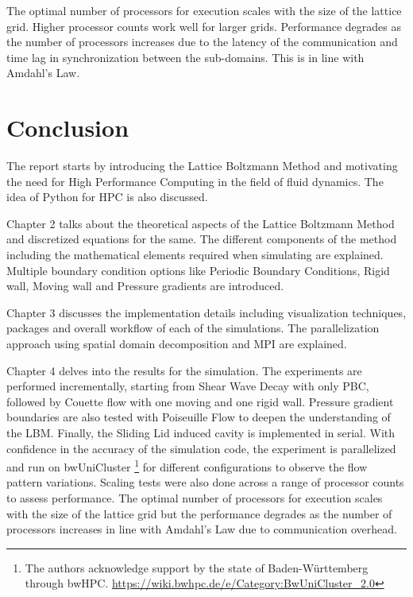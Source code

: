 \documentclass[a4paper,11pt]{report}
\begin{document}
The optimal number of processors for execution scales with the size of the lattice grid. Higher processor counts work well for larger grids. Performance degrades as the number of processors increases due to the latency of the communication and time lag in synchronization between the sub-domains. This is in line with Amdahl's Law.


\chapter{Conclusion}
The report starts by introducing the Lattice Boltzmann Method and motivating the need for High Performance Computing in the field of fluid dynamics. The idea of Python for HPC is also discussed.

Chapter 2 talks about the theoretical aspects of the Lattice Boltzmann Method and discretized equations for the same. The different components of the method including the mathematical elements required when simulating are explained. Multiple boundary condition options like Periodic Boundary Conditions, Rigid wall, Moving wall and Pressure gradients are introduced.

Chapter 3 discusses the implementation details including visualization techniques, packages and overall workflow of each of the simulations. The parallelization approach using spatial domain decomposition and MPI are explained.

Chapter 4 delves into the results for the simulation. The experiments are performed incrementally, starting from Shear Wave Decay with only PBC, followed by Couette flow with one moving and one rigid wall. Pressure gradient boundaries are also tested with Poiseuille Flow to deepen the understanding of the LBM. Finally, the Sliding Lid induced cavity is implemented in serial. With confidence in the accuracy of the simulation code, the experiment is parallelized and run on bwUniCluster \footnote{The authors acknowledge support by the state of Baden-Württemberg through bwHPC. 
 \url{https://wiki.bwhpc.de/e/Category:BwUniCluster_2.0}} for different configurations to observe the flow pattern variations. Scaling tests were also done across a range of processor counts to assess performance. The optimal number of processors for execution scales with the size of the lattice grid but the performance degrades as the number of processors increases in line with Amdahl's Law due to communication overhead.
 



\end{document}
